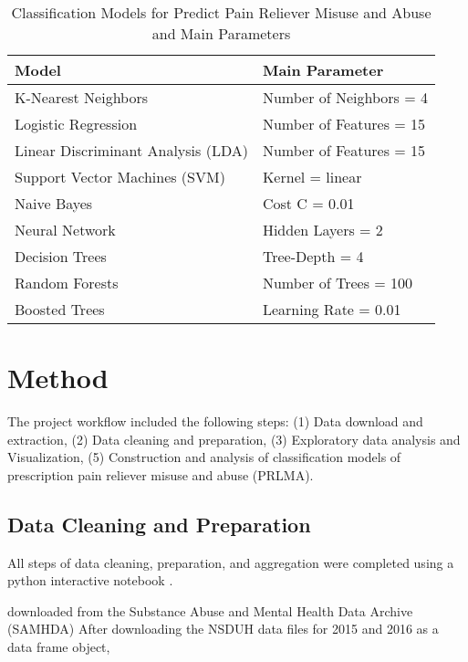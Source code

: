 \documentclass[sigconf]{acmart}
\begin{document}

\begin{table}
  \caption{Classification Models for Predict Pain Reliever Misuse 
  and Abuse and Main Parameters}
  \label{tab:freq}
  \begin{tabular}{ll}
    \toprule
    Model & Main Parameter \\
    \midrule
    K-Nearest Neighbors & Number of Neighbors = 4 \\
    Logistic Regression & Number of Features = 15 \\
    Linear Discriminant Analysis (LDA) & Number of Features = 15 \\
    Support Vector Machines (SVM) & Kernel = linear \\
    Naive Bayes & Cost C = 0.01 \\
    Neural Network & Hidden Layers = 2 \\
    Decision Trees & Tree-Depth = 4 \\ 
    Random Forests & Number of Trees = 100 \\
    Boosted Trees & Learning Rate = 0.01 \\ 
    \bottomrule
  \end{tabular}
\end{table}

\section{Method}

The project workflow included the following steps: (1) Data download and 
extraction, (2) Data cleaning and preparation, (3) Exploratory data analysis 
and Visualization, (5) Construction and analysis of classification models of
prescription pain reliever misuse and abuse (PRLMA).

\subsection{Data Cleaning and Preparation }

All steps of data cleaning, preparation, and aggregation were completed using 
a python interactive notebook \cite{mckinney17}.

downloaded from the Substance Abuse and Mental 
Health Data Archive (SAMHDA) \cite{samhsa18}
After downloading the NSDUH 
data files for 2015 and 2016 as a data frame object,
\end{document}
